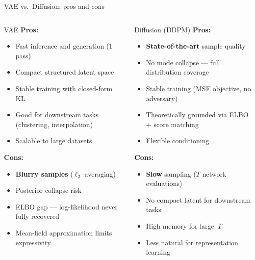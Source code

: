 \documentclass[aspectratio=169,11pt]{beamer}
\begin{document}
\begin{frame}{VAE vs.\ Diffusion: pros and cons}

\begin{columns}[T]
\begin{block}{VAE}
\textcolor{green!60!black}{\textbf{Pros:}}
\begin{itemize}\small
  \item Fast inference and generation (1 pass)
  \item Compact structured latent space
  \item Stable training with closed-form KL
  \item Good for downstream tasks (clustering, interpolation)
  \item Scalable to large datasets
\end{itemize}
\textcolor{red!60!black}{\textbf{Cons:}}
\begin{itemize}\small
  \item \textbf{Blurry samples} ($\ell_2$-averaging)
  \item Posterior collapse risk
  \item ELBO gap — log-likelihood never fully recovered
  \item Mean-field approximation limits expressivity
\end{itemize}
\end{block}

\begin{block}{Diffusion (DDPM)}
\textcolor{green!60!black}{\textbf{Pros:}}
\begin{itemize}\small
  \item \textbf{State-of-the-art} sample quality
  \item No mode collapse — full distribution coverage
  \item Stable training (MSE objective, no adversary)
  \item Theoretically grounded via ELBO + score matching
  \item Flexible conditioning
\end{itemize}
\textcolor{red!60!black}{\textbf{Cons:}}
\begin{itemize}\small
  \item \textbf{Slow} sampling ($T$ network evaluations)
  \item No compact latent for downstream tasks
  \item High memory for large~$T$
  \item Less natural for representation learning
\end{itemize}
\end{block}
\end{columns}
\end{frame}
\end{document}
